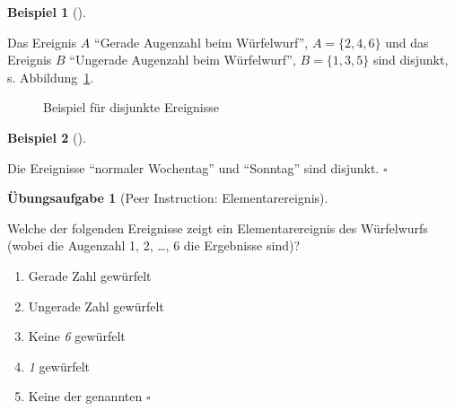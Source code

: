 \documentclass[
  ngerman,
  letterpaper,
  twoside,
  open=any]{scrbook}
\providecommand{\tightlist}{%
  \setlength{\itemsep}{0pt}\setlength{\parskip}{0pt}}\usepackage{longtable,booktabs,array}
\theoremstyle{definition}
\newtheorem{example}{Beispiel}[chapter]
\theoremstyle{plain}
\theoremstyle{definition}
\newtheorem{exercise}{Übungsaufgabe}[chapter]
\theoremstyle{definition}
\theoremstyle{definition}
\newtheorem{example}{Beispiel}[chapter]
\theoremstyle{definition}
\newtheorem{exercise}{Übungsaufgabe}[chapter]
\theoremstyle{remark}
\begin{document}
\begin{example}[]\protect\hypertarget{exm-disjunkt1}{}\label{exm-disjunkt1}

Das Ereignis \(A\) \enquote{Gerade Augenzahl beim Würfelwurf},
\(A=\{2,4,6\}\) und das Ereignis \(B\) \enquote{Ungerade Augenzahl beim
Würfelwurf}, \(B=\{1,3,5\}\) sind disjunkt, s.
Abbildung~\ref{fig-disjunkt1}.

\begin{figure}[H]


\caption{\label{fig-disjunkt1}Beispiel für disjunkte Ereignisse}

\end{figure}%

\end{example}

\begin{example}[]\protect\hypertarget{exm-disjunkt2}{}\label{exm-disjunkt2}

Die Ereignisse \enquote{normaler Wochentag} und \enquote{Sonntag} sind
disjunkt. \(\square\)

\end{example}

\begin{exercise}[Peer Instruction:
Elementarereignis]\protect\hypertarget{exr-elementarereignis}{}\label{exr-elementarereignis}

Welche der folgenden Ereignisse zeigt ein Elementarereignis des
Würfelwurfs (wobei die Augenzahl 1, 2, \ldots, 6 die Ergebnisse sind)?

\begin{enumerate}
\def\labelenumi{\Alph{enumi})}
\tightlist
\item
  Gerade Zahl gewürfelt
\item
  Ungerade Zahl gewürfelt
\item
  Keine \emph{6} gewürfelt
\item
  \emph{1} gewürfelt
\item
  Keine der genannten \(\square\)
\end{enumerate}

\end{exercise}
\end{document}

